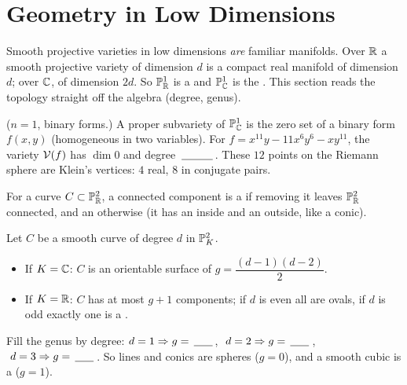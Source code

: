 \section{Geometry in Low Dimensions}\label{sec:lowdim}
\quad{}

\begin{strand}
Smooth projective varieties in low dimensions \emph{are} familiar manifolds. Over $\R$ a smooth
projective variety of dimension $d$ is a compact real manifold of dimension $d$; over $\C$, of
dimension $2d$. So $\PP^1_{\R}$ is a \fillin[2cm] and $\PP^1_{\C}$ is the . This
section reads the topology straight off the algebra (degree, genus).
\end{strand}


\begin{yourturn}
($n=1$, binary forms.) A proper subvariety of $\PP^1_{\C}$ is the zero set of a binary form
$f(x,y)$ (homogeneous in two variables). For $f=x^{11}y-11x^6y^6-xy^{11}$, the variety $\V(f)$ has
$\dim 0$ and degree $\fillin[1cm]$. These $12$ points on the Riemann sphere are Klein's
 vertices: $4$ real, $8$ in conjugate pairs. 
\end{yourturn}

For a curve $C\subset\PP^2_{\R}$, a connected component is a  if removing it leaves
$\PP^2_{\R}$ connected, and an  otherwise (it has an inside and an outside, like a conic).

\begin{theorem}\label{thm:curve}
Let $C$ be a smooth curve of degree $d$ in $\PP^2_K$.
\begin{itemize}[leftmargin=1.3em,itemsep=1pt]
  \item If $K=\C$: $C$ is an orientable surface of  $g=\dfrac{(d-1)(d-2)}{2}$.
  \item If $K=\R$: $C$ has at most $g+1$ components; if $d$ is even all are ovals, if $d$ is odd exactly
        one is a \fillin[2.5cm].
\end{itemize}
\end{theorem}
\begin{yourturn}
Fill the genus by degree: $d=1\Rightarrow g=\fillin[0.6cm]$, $\ d=2\Rightarrow g=\fillin[0.6cm]$,
$\ d=3\Rightarrow g=\fillin[0.6cm]$. So lines and conics are spheres ($g=0$), and a smooth cubic is a
\fillin[1.5cm] ($g=1$).
\end{yourturn}

